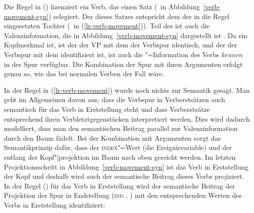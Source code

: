 Die Regel in () lizenziert ein Verb, das einen Satz (\, in
Abbildung~\ref{verb-movement-syn}) selegiert. Der \dslw dieses Satzes entspricht dem \locw der in
die Regel eingesetzten Tochter (\, in (\ref{lr-verb-movement})). Teil des \dslwes ist auch die Valenzinformation, die in
Abbildung~\ref{verb-movement-syn} dargestellt ist . Da \dsl ein Kopfmerkmal ist, ist der
\dslw der VP mit dem der Verbspur identisch, und der \locw der Verbspur mit dem \dslw identifiziert ist, ist auch die \comps"=Information des Verbs
\emph{kennen} in der Spur verfügbar. Die Kombination der Spur mit ihren Argumenten erfolgt genau so,
wie das bei normalen Verben der Fall wäre.


In der Regel in (\ref{lr-verb-movement}) wurde noch nichts zur Semantik gesagt. Man geht im Allgemeinen davon aus, dass
die Verbspur in Verberstsätzen auch semantisch für das Verb in Erststellung steht und
dass Verberstsätze entsprechend ihren Verbletztgegenstücken interpretiert werden. Dies
wird dadurch modelliert, dass man den semantischen Beitrag parallel zur Valenzinformation
durch den Baum fädelt. 
Bei der Kombination mit Argumenten sorgt das Semantikprinzip dafür, 
dass der \textsc{index}"=Wert (die Ereignisvariable) und der \ltopw entlang der Kopf"|projektion im Baum nach
oben gereicht werden. Im letzten Projektionsschritt in Abbildung~\ref{verb-movement-syn}
ist das Verb in Erststellung der Kopf und deshalb wird auch der semantische Beitrag
dieses Verbs projiziert. In der Regel () für das Verb in Erststellung wird
der semantische Beitrag der Projektion der Spur in Endstellung (\textsc{ind} , \ltop {}) mit
den entsprechenden Werten des Verbs in Erststellung identifiziert:
\largerpage

